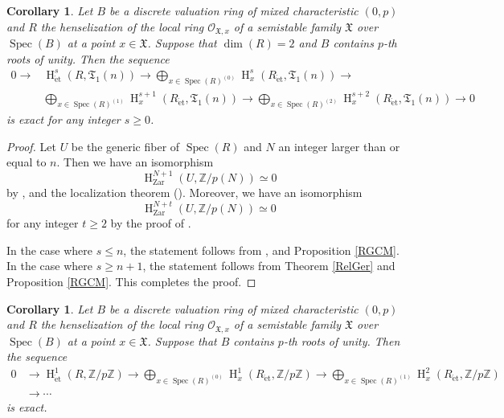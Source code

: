 \documentclass{article}
\newtheorem{cor}[thm]{\indent \sc Corollary}
\newcommand{\spec}{\operatorname{Spec}}
\newcommand{\et}{\mathrm{\acute{e}t}}
\newcommand{\Zar}{\mathrm{Zar}}
\newcommand{\HO}{\operatorname{H}}
\begin{document}
%
\begin{cor}\upshape\label{2GerT}
Let $B$ be a discrete valuation ring of mixed characteristic $(0, p)$ 
and $R$ the henselization of the local ring $\mathcal{O}_{\mathfrak{X}, x}$ of a semistable family $\mathfrak{X}$ over $\spec(B)$
at a point $x\in \mathfrak{X}$. 
Suppose that $\operatorname{dim}(R)=2$ and $B$ contains $p$-th roots of unity.
Then the sequence
%
\begin{align*}
0
\to  
&\HO^{s}_{\et}(
R, \mathfrak{T}_{1}(n)
)
\to
\bigoplus_{x\in \spec(R)^{(0)}}
\HO^{s}_{x}(
R_{\et},
\mathfrak{T}_{1}(n)
)
\to
\\
&\bigoplus_{x\in \spec(R)^{(1)}}
\HO^{s+1}_{x}(
R_{\et},
\mathfrak{T}_{1}(n)
)
\to
\bigoplus_{x\in \spec(R)^{(2)}}
\HO^{s+2}_{x}(
R_{\et},
\mathfrak{T}_{1}(n)
)
\to 0
\end{align*}
%
is exact for any integer $s\geq 0$.
\end{cor}
%

%
\begin{proof}\upshape
Let $U$ be the generic fiber of $\spec(R)$ and 
$N$ an integer larger than or equal to $n$. 
Then we have an isomorphism
%
\begin{equation*}
\HO^{N+1}_{\Zar}(U, \mathbb{Z}/p(N))
\simeq 0
\end{equation*}
%
by \cite[Proposition 4.5]{Sak4}, \cite[Proposition 2.1]{Sak4}
and
the localization theorem (\cite[p.779, Theorem 3.2]{Ge}).
Moreover, we have  an isomorphism
%
\begin{equation*}
\HO^{N+t}_{\Zar}(
U,
\mathbb{Z}/p(N)
) 
\simeq 
0
\end{equation*}
%
for any integer $t\geq 2$
by the proof of \cite[Corollary 4.6]{Sak4}.

In the case where $s\leq n$, the statement follows from \cite[p.540, Theorem 4.4.7]{SaP},
\cite[Theorem 1.1]{Sak4} and Proposition \ref{RGCM}.
In the case where $s\geq n+1$, the statement follows from Theorem \ref{RelGer} and Proposition \ref{RGCM}.
This completes the proof.
\end{proof}
%


%
\begin{cor}\upshape
Let $B$ be a discrete valuation ring of mixed characteristic $(0, p)$ 
and $R$ the henselization of the local ring $\mathcal{O}_{\mathfrak{X}, x}$
of a semistable family $\mathfrak{X}$ over $\spec(B)$ at a point $x\in \mathfrak{X}$. 
Suppose that $B$ contains $p$-th roots of unity. Then the sequence
%
\begin{align*}
0
&\to    
\HO^{1}_{\et}(
R, 
\mathbb{Z}/p\mathbb{Z}
)
\to
\bigoplus_{x\in \spec(R)^{(0)}}
\HO^{1}_{x}(
R_{\et},
\mathbb{Z}/p\mathbb{Z}
)
\to
\bigoplus_{x\in \spec(R)^{(1)}}
\HO^{2}_{x}(
R_{\et},
\mathbb{Z}/p\mathbb{Z}
)
\\
&\to\cdots
\end{align*}
%
is exact.
\end{cor}
%
\end{document}
